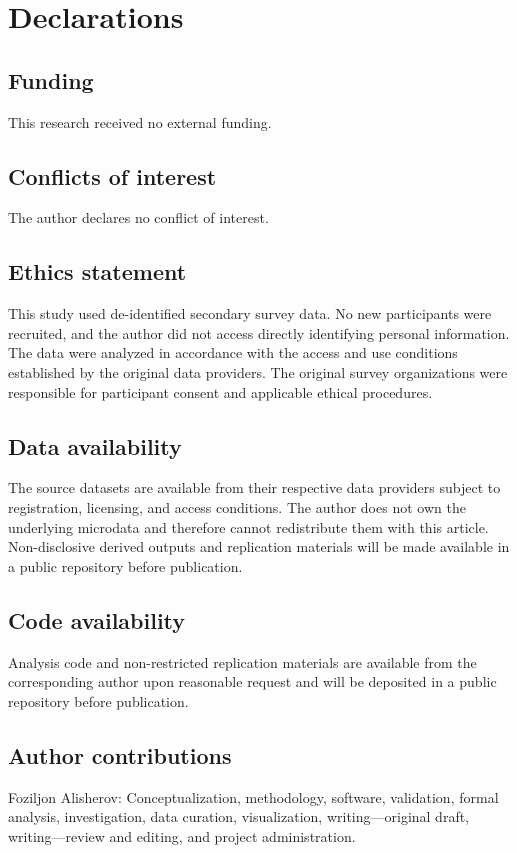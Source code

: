 \documentclass[11pt]{article}
\begin{document}
\section{Declarations}

\subsection*{Funding}
This research received no external funding.

\subsection*{Conflicts of interest}
The author declares no conflict of interest.

\subsection*{Ethics statement}
This study used de-identified secondary survey data. No new participants were recruited, and the author did not access directly identifying personal information. The data were analyzed in accordance with the access and use conditions established by the original data providers. The original survey organizations were responsible for participant consent and applicable ethical procedures.

\subsection*{Data availability}
The source datasets are available from their respective data providers subject to registration, licensing, and access conditions. The author does not own the underlying microdata and therefore cannot redistribute them with this article. Non-disclosive derived outputs and replication materials will be made available in a public repository before publication.

\subsection*{Code availability}
Analysis code and non-restricted replication materials are available from the corresponding author upon reasonable request and will be deposited in a public repository before publication.

\subsection*{Author contributions}
Foziljon Alisherov: Conceptualization, methodology, software, validation, formal analysis, investigation, data curation, visualization, writing---original draft, writing---review and editing, and project administration.
\end{document}
